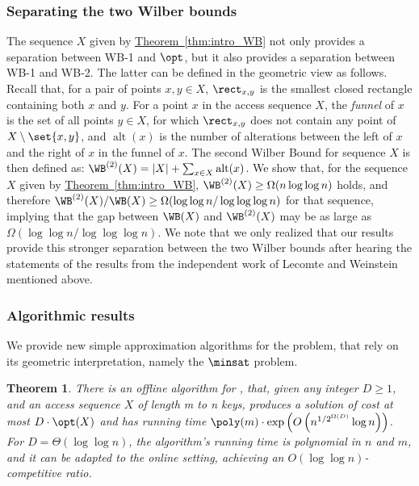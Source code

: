 \documentclass[11pt]{article}
\numberwithin{equation}{section}
\newtheorem{theorem}{Theorem}[section]
\theoremstyle{definition}
\theoremstyle{plain}
\newcommand{\expref}[2]{\hyperref[#2]{#1~\ref{#2}}}
\begin{document}
\subsubsection{Separating the two Wilber bounds} The sequence $X$ given by \expref{Theorem}{thm:intro_WB} not only provides a separation between WB-1 and $\opt$, but it also provides a separation between WB-1 and WB-2. The latter can be defined in the geometric view as follows. Recall that, for a pair of points $x,y\in X$, $\rect_{x,y}$ is the smallest closed rectangle containing both $x$ and $y$. For a point $x$ in the access sequence $X$, the \emph{funnel} of $x$ is the set of all points $y\in X$, for which $\rect_{x,y}$ does not contain any point of $X\setminus\set{x,y}$, and $\operatorname{alt}(x)$ is the number of alterations between the left of $x$ and the right of $x$ in the {funnel} of $x$. The second Wilber Bound for sequence $X$ is then defined as: $\WB^{(2)}(X)=|X|+\sum_{x\in X}\operatorname{alt}(x)$. 
We show that, for the sequence $X$ given by \expref{Theorem}{thm:intro_WB}, $\WB^{(2)}(X) \geq \Omega(n \log \log n)$ holds, and therefore $\WB^{(2)}(X)/\WB(X) \geq \Omega(\log \log n/ \log \log \log n)$ for that sequence, implying that  the gap between $\WB(X)$ and $\WB^{(2)}(X)$ may be as large as $\Omega(\log \log n/ \log \log \log n)$. 
We note that we only realized that our results provide this stronger separation between the two Wilber bounds after hearing the statements of the results from the independent work of Lecomte and Weinstein~\cite{LW19}  mentioned above.   



\subsubsection{Algorithmic results}

We provide new simple approximation algorithms for the problem, that rely on its geometric interpretation, namely the $\minsat$ problem.





\begin{theorem}
\label{thm:intro_alg} There  is
an offline algorithm for \minsat, that, given any integer $D\ge1$, and an access sequence $X$ of length m to n keys, produces a solution of cost at most $D\cdot\opt(X)$ and has running
time  $\poly(m) \cdot \exp\left(O\left (n^{1/2^{\Omega(D)}}\log n\right )\right )$.  
For 
$D=\Theta(\log\log n)$, the algorithm's running time is polynomial in $n$ and $m$, and it can be adapted to the online setting, achieving an $O(\log\log n)$-competitive ratio.
\end{theorem}
\end{document}
